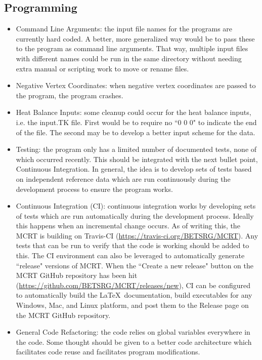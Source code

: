 \documentclass{article}
\begin{document}
\subsection{Programming}

\begin{itemize}
    \item Command Line Arguments: the input file names for the programs are currently hard coded. A better, more generalized way would be to pass these to the program as command line arguments. That way, multiple input files with different names could be run in the same directory without needing extra manual or scripting work to move or rename files.

    \item Negative Vertex Coordinates: when negative vertex coordinates are passed to the program, the program crashes.

    \item Heat Balance Inputs: some cleanup could occur for the heat balance inputs, i.e. the input.TK file. First would be to require no ``0 0 0" to indicate the end of the file. The second may be to develop a better input scheme for the data.

    \item Testing: the program only has a limited number of documented tests, none of which occurred recently. This should be integrated with the next bullet point, Continuous Integration. In general, the idea is to develop sets of tests based on independent reference data which are run continuously during the development process to ensure the program works.

    \item Continuous Integration (CI): continuous integration works by developing sets of tests which are run automatically during the development process. Ideally this happens when an incremental change occurs. As of writing this, the MCRT is building on Travis-CI (\url{https://travis-ci.org/BETSRG/MCRT}). Any tests that can be run to verify that the code is working should be added to this. The CI environment can also be leveraged to automatically generate ``release" versions of MCRT. When the ``Create a new release" button on the MCRT GitHub repository has been hit (\url{https://github.com/BETSRG/MCRT/releases/new}), CI can be configured to automatically build the \LaTeX ~documentation, build executables for any Windows, Mac, and Linux platform, and post them to the Release page on the MCRT GitHub repository.

    \item General Code Refactoring: the code relies on global variables everywhere in the code. Some thought should be given to a better code architecture which facilitates code reuse and facilitates program modifications.


\end{itemize}
\end{document}
